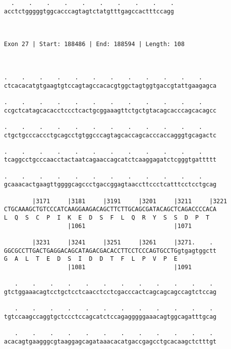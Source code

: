 \documentclass{article}
\begin{document}
\begin{Verbatim}
  .    .    .    .    .    .    .    .    .    .
acctctgggggtggcacccagtagtctatgtttgagccactttccagg
                                                
                                                
 
Exon 27 | Start: 188486 | End: 188594 | Length: 108



.    .    .    .    .    .    .    .    .    .    .    .    
ctcacacatgtgaagtgtccagtagccacacgtggctagtggtgaccgtattgaagagca
                                                            
.    .    .    .    .    .    .    .    .    .    .    .    
ccgctcatagcacacctccctcactgcggaaagttctgctgtacagcacccagcacagcc
                                                            
.    .    .    .    .    .    .    .    .    .    .    .    
ctgctgcccaccctgcagcctgtggcccagtagcaccagcacccaccagggtgcagactc
                                                            
.    .    .    .    .    .    .    .    .    .    .    .    
tcaggcctgcccaacctactaatcagaaccagcatctcaaggagatctcgggtgattttt
                                                            
.    .    .    .    .    .    .    .    .    .    .    .    
gcaaacactgaagttggggcagccctgaccggagtaaccttccctcatttcctcctgcag
                                                            
        |3171     |3181     |3191     |3201     |3211     |3221
CTGCAAAGCTGTCCCATCAAGGAAGACAGCTTCTTGCAGCGATACAGCTCAGACCCCACA
L  Q  S  C  P  I  K  E  D  S  F  L  Q  R  Y  S  S  D  P  T  
                  |1061                         |1071       
  
        |3231     |3241     |3251     |3261     |3271.    . 
GGCGCCTTGACTGAGGACAGCATAGACGACACCTTCCTCCCAGTGCCTGgtgagtggctt
G  A  L  T  E  D  S  I  D  D  T  F  L  P  V  P  E           
                  |1081                         |1091       
  
   .    .    .    .    .    .    .    .    .    .    .    . 
gtctggaaacagtcctgctcctcaacctcctcgacccactcagcagcagccagtctccag
                                                            
   .    .    .    .    .    .    .    .    .    .    .    . 
tgtccaagccaggtgctccctccagcatctccagagggggaaacagtggcagatttgcag
                                                            
   .    .    .    .    .    .    .    .    .    .    .    . 
acacagtgaagggcgtaaggagcagataaacacatgaccgagcctgcacaagctctttgt
                                                            

\end{Verbatim}
\end{document}
